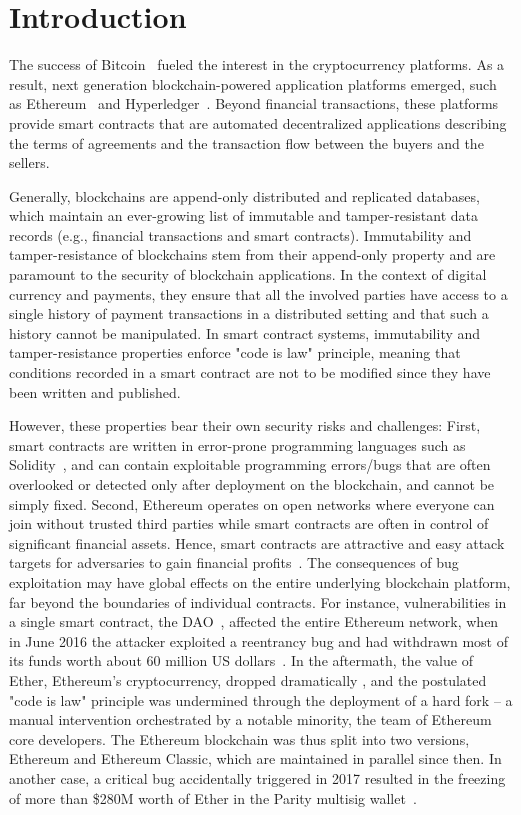 \section{Introduction} 
\label{ch:introduction}
The success of Bitcoin~\cite{bitcoin} fueled the interest in the cryptocurrency platforms.
As a result, next generation blockchain-powered application platforms emerged, such as Ethereum~\cite{ethereum-whitepaper} and Hyperledger~\cite{Hyperledger}. Beyond financial transactions, these platforms provide smart contracts that are automated decentralized applications describing the terms of agreements and the transaction flow between the buyers and the sellers.

Generally, blockchains are append-only distributed and replicated databases, which maintain an ever-growing list of immutable and tamper-resistant data records (e.g., financial transactions and smart contracts). Immutability and tamper-resistance of blockchains stem from their append-only property and are paramount to the security of blockchain applications. In the context of digital currency and payments, they ensure that all the involved parties have access to a single history of payment transactions in a distributed setting and that such a history cannot be manipulated. In smart contract systems, immutability and tamper-resistance properties enforce "code is law" principle, meaning that conditions recorded in a smart contract are not to be modified since they have been written and published.

However, these properties bear their own security risks and challenges: 
First, smart contracts are written in error-prone programming languages such as Solidity~\cite{solidity}, and can contain exploitable programming errors/bugs that are often overlooked or detected only after deployment on the blockchain, and cannot be simply fixed.  
Second, Ethereum operates on open networks where everyone can join without trusted third parties while smart contracts are often in control of significant financial assets. Hence, smart contracts are attractive and easy attack targets for adversaries to gain financial profits~\cite{SmartContractsBugs}. The consequences of bug exploitation may have global effects on the entire underlying blockchain platform, far beyond the boundaries of individual contracts.
For instance, vulnerabilities in a single smart contract, the DAO~\cite{TheDAO}, affected the entire Ethereum network, when in June 2016 the attacker exploited a reentrancy bug and had withdrawn most of its funds worth about 60 million US dollars~\cite{DAO_01,DAO_02}. In the aftermath, the value of Ether, Ethereum's cryptocurrency, dropped dramatically \cite{EtherPriceDrop2016}, and the postulated "code is law" principle was undermined through the deployment of a hard fork -- a manual intervention orchestrated by a notable minority, the team of Ethereum core developers.
The Ethereum blockchain was thus split into two versions, Ethereum and Ethereum Classic, which are maintained in parallel since then. 
In another case, a critical bug accidentally triggered in 2017 resulted in the freezing of more than \$280M worth of Ether in the Parity multisig wallet~\cite{Parity2017}. 

